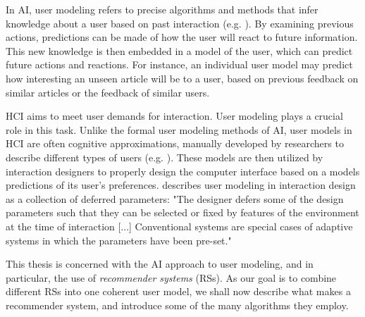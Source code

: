 In AI, user modeling refers to precise algorithms and methods that infer knowledge about a user based on past interaction 
(e.g. \cite{Pazzani2007, Smyth2007, Alshamri2008, Resnick1994}).
By examining previous actions, predictions can be made of how the user will react to future information. This new knowledge is then embedded in a model of the user, which can predict future actions and reactions. 
For instance, an individual user model may predict how interesting an unseen article will be to a user, based on previous feedback on similar articles or the feedback of similar users.

HCI aims to meet user demands for interaction. 
User modeling plays a crucial role in this task. 
Unlike the formal user modeling methods of AI, user models in HCI are often cognitive approximations, manually developed by researchers to describe different types of users 
(e.g. \cite{Fischer2001, Jameson2009, Cato2001}).
These models are then utilized by interaction designers to properly design the computer interface based on a models predictions of its user’s preferences.
\cite{Totterdell1990} describes user modeling in interaction design as a collection of deferred parameters: "The designer defers some of the design parameters such that they can be selected or fixed by features of the environment at the time of interaction [...] Conventional systems are special cases of adaptive systems in which the parameters have been pre-set."

This thesis is concerned with the AI approach to user modeling, and in particular, the use of \emph{recommender systems} (RSs).
As our goal is to combine different RSs into one coherent user model, 
we shall now describe what makes a recommender system,
and introduce some of the many algorithms they employ.


